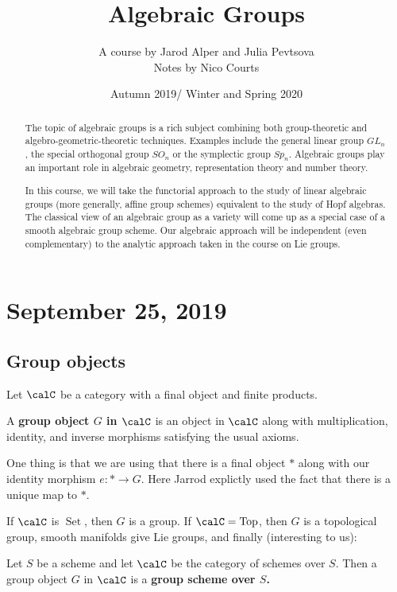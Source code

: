\documentclass[12pt]{article}
\begin{document}
\title{Algebraic Groups\vspace{-1ex}}
\author{A course by Jarod Alper and Julia Pevtsova\\
Notes by Nico Courts}
\date{Autumn 2019/ Winter and Spring 2020}
\maketitle

\begin{abstract}
	The topic of algebraic groups is a rich subject combining both group-theoretic and algebro-geometric-theoretic techniques. Examples include the general linear group $GL_n$, 
	the special orthogonal group $SO_n$ or the symplectic group $Sp_n$. Algebraic groups play an important role in algebraic geometry, representation theory and number theory.

	In this course, we will take the functorial approach to the study of linear algebraic groups (more generally, affine group schemes) equivalent to the study of Hopf algebras. 
	The classical view of an algebraic group as a variety will come up as a special case of a smooth algebraic group scheme. Our algebraic approach will be independent (even complementary) to the analytic approach taken in the course on Lie groups.
\end{abstract}

\section{September 25, 2019}
\subsection{Group objects}
Let $\calC$ be a category with a final object and finite products.
\begin{defn}
	A \textbf{group object $G$ in $\calC$} is an object in $\calC$ along with multiplication, identity, and inverse morphisms
	satisfying the usual axioms.
\end{defn}

One thing is that we are using that there is a final object $\ast$ along with our identity morphism $e:\ast\to G$.
Here Jarrod explictly used the fact that there is a unique map to $\ast$.

\begin{ex}
	If $\calC$ is $\operatorname{Set}$, then $G$ is a group. If $\calC=\operatorname{Top}$, then $G$ is a topological group, smooth manifolds give Lie groups, and finally (interesting to us):
\end{ex}
\begin{defn}
	Let $S$ be a scheme and let $\calC$ be the category of schemes over $S$. Then a group object $G$ in $\calC$ is 
	a \textbf{group scheme over $S$.}
\end{defn}
\end{document}
